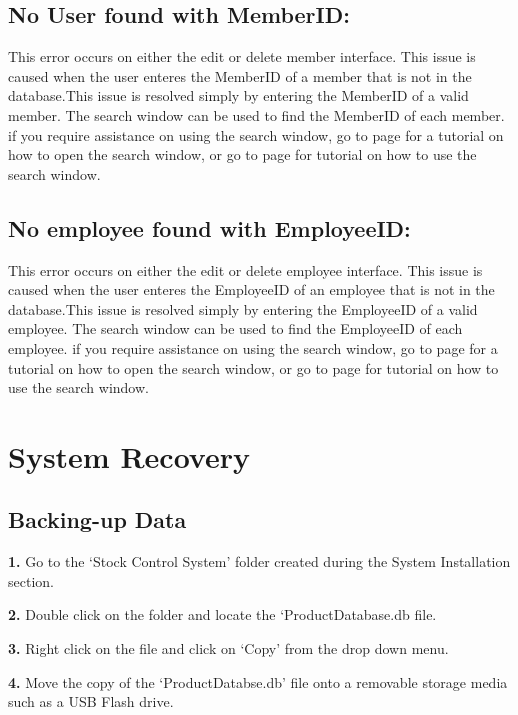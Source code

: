 \subsection{No User found with MemberID:}

This error occurs on either the edit or delete member interface. This issue is caused when the user enteres the MemberID of a member that is not in the database.This issue is resolved simply by entering the MemberID of a valid member. The search window can be used to find the MemberID of each member. if you require assistance on using the search window, go to page \pageref{fig:Accessing the search window} for a tutorial on how to open the search window, or go to page \pageref{fig:Using the search window} for tutorial on how to use the search window.

\subsection{No employee found with EmployeeID:}

This error occurs on either the edit or delete employee interface. This issue is caused when the user enteres the EmployeeID of an employee that is not in the database.This issue is resolved simply by entering the EmployeeID of a valid employee. The search window can be used to find the EmployeeID of each employee. if you require assistance on using the search window, go to page \pageref{fig:Accessing the search window} for a tutorial on how to open the search window, or go to page \pageref{fig:Using the search window} for tutorial on how to use the search window.



\section{System Recovery}

\subsection{Backing-up Data}

\textbf{1.} Go to the `Stock Control System' folder created during the System Installation section.

\textbf{2.} Double click on the folder and locate the `ProductDatabase.db file.

\textbf{3.} Right click on the file and click on `Copy' from the drop down menu.

\textbf{4.} Move the copy of the `ProductDatabse.db' file onto a removable storage media such as a USB Flash drive.

